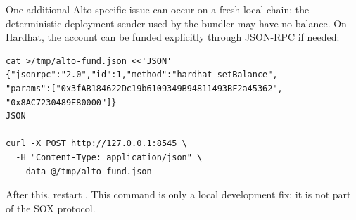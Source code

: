 One additional Alto-specific issue can occur on a fresh local chain: the deterministic
deployment sender used by the bundler may have no balance. On Hardhat, the account can be
funded explicitly through JSON-RPC if needed:

\begin{verbatim}
cat >/tmp/alto-fund.json <<'JSON'
{"jsonrpc":"2.0","id":1,"method":"hardhat_setBalance",
"params":["0x3fAB184622Dc19b6109349B94811493BF2a45362",
"0x8AC7230489E80000"]}
JSON

curl -X POST http://127.0.0.1:8545 \
  -H "Content-Type: application/json" \
  --data @/tmp/alto-fund.json
\end{verbatim}

After this, restart . This command is only a local development fix; it is
not part of the SOX protocol.
